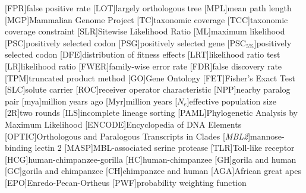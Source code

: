 
[FPR]{false positive rate}
[LOT]{largely orthologous tree}
[MPL]{mean path length}
[MGP]{Mammalian Genome Project}
[TC]{taxonomic coverage}
[TCC]{taxonomic coverage constraint}
[SLR]{Sitewise Likelihood Ratio}
[ML]{maximum likelihood}
[PSC]{positively selected codon}
[PSG]{positively selected gene}
[PSC$_{5\%}$]{positively selected codon}
[DFE]{distribution of fitness effects}
[LRT]{likelihood ratio test}
[LR]{likelihood ratio}
[FWER]{family-wise error rate}
[FDR]{false discovery rate}
[TPM]{truncated product method}
[GO]{Gene Ontology}
[FET]{Fisher's Exact Test}
[SLC]{solute carrier}
[ROC]{receiver operator characteristic}
[NPP]{nearby paralog pair}
[mya]{million years ago}
[Myr]{million years}
[$N_{e}$]{effective population size}
[2R]{two rounds}
[ILS]{incomplete lineage sorting}
[PAML]{Phylogenetic Analysis by Maximum Likelihood}
[ENCODE]{Encyclopedia of DNA Elements}
[OPTIC]{Orthologous and Paralogous Transcripts in Clades}
[\emph{MBL2}]{mannose-binding lectin 2}
[MASP]{MBL-associated serine protease}
[TLR]{Toll-like receptor}
[HCG]{human-chimpanzee-gorilla}
[HC]{human-chimpanzee}
[GH]{gorila and human}
[GC]{gorila and chimpanzee}
[CH]{chimpanzee and human}
[AGA]{African great apes}
[EPO]{Enredo-Pecan-Ortheus}
[PWF]{probability weighting function}

\newcommand{\tocite}[2]{}

\newcommand{\TODO}[1]{\textcolor{red}{TODO} \todo{#1}\xspace}
\newcommand{\draft}[1]{\textcolor{gray}{[#1]}\xspace}

\newcommand{\gene}[1]{\emph{#1}}
\newcommand{\species}[1]{\emph{#1}}

\newcommand{\syn}{synonymous\xspace}
\newcommand{\nsyn}{nonsynonymous\xspace}

\newcommand{\sw}{sitewise\xspace}
\newcommand{\ml}{maximum likelihood\xspace}

